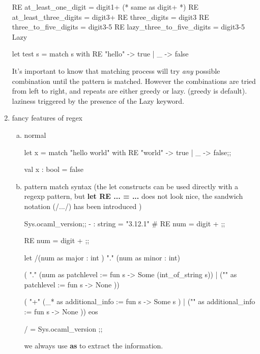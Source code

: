 \begin{enumerate}
\begin{ocamlcode}
RE at_least_one_digit = digit{1+}     (* same as digit+ *)
RE at_least_three_digits = digit{3+}
RE three_digits = digit{3}
RE three_to_five_digits = digit{3-5}
RE lazy_three_to_five_digits = digit{3-5} Lazy

let test s = match s with 
    RE "hello" -> true 
  | _ -> false 
\end{ocamlcode}


It's important to know that matching process will try \textit{any} possible combination until
the pattern is matched. However the combinations are tried from left to right, and
repeats are either greedy or lazy. (greedy is default). laziness triggered by the presence
of the Lazy keyword.

\item fancy features of regex
  \begin{enumerate}[(a)]
  \item normal

    \begin{ocamlcode}
let x = match "hello world" with
  RE "world" -> true
 | _ -> false;;
\end{ocamlcode}

    \begin{ocamlcode}
val x : bool = false
  \end{ocamlcode}

\item pattern match syntax 
  (the let constructs can be used directly with a
  regexp pattern, but \textbf{let RE ... = ... }does not look nice, the
  sandwich notation (/.../) has been introduced )

  \begin{alternate}
Sys.ocaml_version;;
- : string = "3.12.1"
# RE num = digit + ;;
\end{alternate}

\begin{ocamlcode}

RE num = digit + ;;
  
let  /(num as major : int ) "." (num as minor : int)

( "." (num as patchlevel := fun s -> Some (int_of_string s)) 
| ("" as patchlevel := fun s -> None ))

( "+" (_*  as additional_info := fun s -> Some s )
| ("" as additional_info  := fun s -> None )) eos

/ = Sys.ocaml_version ;;

\end{ocamlcode}

we always use \textbf{as} to extract the information.      


\end{enumerate}
\end{enumerate}
